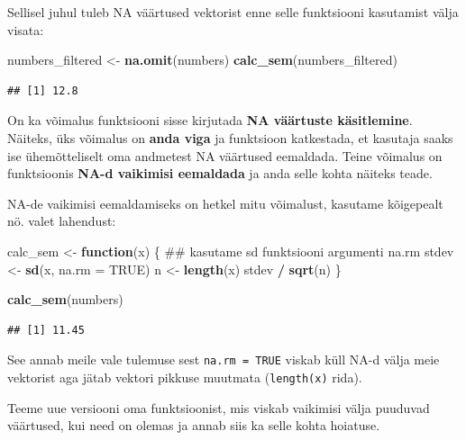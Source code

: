 \documentclass[]{book}
\newenvironment{Shaded}{\begin{snugshade}}{\end{snugshade}}
\newcommand{\KeywordTok}[1]{\textcolor[rgb]{0.13,0.29,0.53}{\textbf{#1}}}
\newcommand{\DataTypeTok}[1]{\textcolor[rgb]{0.13,0.29,0.53}{#1}}
\newcommand{\StringTok}[1]{\textcolor[rgb]{0.31,0.60,0.02}{#1}}
\newcommand{\OtherTok}[1]{\textcolor[rgb]{0.56,0.35,0.01}{#1}}
\newcommand{\ControlFlowTok}[1]{\textcolor[rgb]{0.13,0.29,0.53}{\textbf{#1}}}
\newcommand{\OperatorTok}[1]{\textcolor[rgb]{0.81,0.36,0.00}{\textbf{#1}}}
\newcommand{\NormalTok}[1]{#1}
\begin{document}
Sellisel juhul tuleb NA väärtused vektorist enne selle funktsiooni
kasutamist välja visata:

\begin{Shaded}
\begin{Highlighting}[]
\NormalTok{numbers_filtered <-}\StringTok{ }\KeywordTok{na.omit}\NormalTok{(numbers)}
\KeywordTok{calc_sem}\NormalTok{(numbers_filtered)}
\end{Highlighting}
\end{Shaded}

\begin{verbatim}
## [1] 12.8
\end{verbatim}

On ka võimalus funktsiooni sisse kirjutada \textbf{NA väärtuste
käsitlemine}. Näiteks, üks võimalus on \textbf{anda viga} ja funktsioon
katkestada, et kasutaja saaks ise ühemõtteliselt oma andmetest NA
väärtused eemaldada. Teine võimalus on funktsioonis \textbf{NA-d
vaikimisi eemaldada} ja anda selle kohta näiteks teade.

NA-de vaikimisi eemaldamiseks on hetkel mitu võimalust, kasutame
kõigepealt nö. valet lahendust:

\begin{Shaded}
\begin{Highlighting}[]
\NormalTok{calc_sem <-}\StringTok{ }\ControlFlowTok{function}\NormalTok{(x) \{}
\NormalTok{  ## kasutame sd funktsiooni argumenti na.rm}
\NormalTok{  stdev <-}\StringTok{ }\KeywordTok{sd}\NormalTok{(x, }\DataTypeTok{na.rm =} \OtherTok{TRUE}\NormalTok{)}
\NormalTok{  n <-}\StringTok{ }\KeywordTok{length}\NormalTok{(x)}
\NormalTok{  stdev }\OperatorTok{/}\StringTok{ }\KeywordTok{sqrt}\NormalTok{(n)}
\NormalTok{\}}

\KeywordTok{calc_sem}\NormalTok{(numbers)}
\end{Highlighting}
\end{Shaded}

\begin{verbatim}
## [1] 11.45
\end{verbatim}

See annab meile vale tulemuse sest \texttt{na.rm\ =\ TRUE} viskab küll
NA-d välja meie vektorist aga jätab vektori pikkuse muutmata
(\texttt{length(x)} rida).

Teeme uue versiooni oma funktsioonist, mis viskab vaikimisi välja
puuduvad väärtused, kui need on olemas ja annab siis ka selle kohta
hoiatuse.
\end{document}
